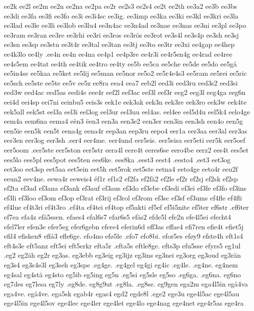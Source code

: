 ee2k
ee2l
ee2m
ee2n
ee2na
ee2pa
ee2r
ee2s3
ee2s4
ee2t
ee2th
ee3a2
ee3b
ee3bs
ee3di
ee3fa
ee3fi
ee3fo
ee3i
ee3i4sc
ee3ig.
ee3imp
ee3ka
ee3ki
ee3kl
ee3kri
ee3la
ee3lad
ee3le
ee3li
ee3lob
ee3lu4
ee3n4ac
ee3n4ad
ee3nae
ee3nas
ee3ni
ee3pl
ee3po
ee3ram
ee3ran
ee3re
ee3rhi
ee3ri
ee3ros
ee3rös
ee3rot
ee3s4l
ee3s4p
ee3sh
ee3sj
ee3sn
ee3sp
ee3stu
ee3t4r
ee3tal
ee3tan
ee3tj
ee3to
ee3tr
ee3xi
ee4gap
ee4hep
ee4k3lo
ee4ly
.ee4n
ee4n
ee4na
ee4p1
ee4p3re
ee4r3i
ee4r5en4g
ee4rad
ee4ree
ee4s5em
ee4tat
ee4th
ee4tik
ee4tro
ee4ty
ee5b
ee5ca
ee5che
ee5de
ee5do
ee5gå
ee5in4se
ee5kaa
ee5ket
ee5lij
ee5man
ee5nor
ee5o2
ee5r4e4s3
ee5ram
ee5rei
ee5ric
ee5sch
ee5ste
ee5te
ee5v
ee5z
ee8ra
eea4
eea7
eeb2l
eed3i
eed3ru
eed3s2
eed3si
eed3w
eed4ac
eed5as
eedi4e
eee4r
eef2l
eef3ac
eef3l
eef3r
eeg2
eeg3l
eeg4ga
eeg6n
eei4d
eei4sp
eei7ni
eeinbu5
eeis3s
eek1e
eek3ak
eek3n
eek3re
eek3ro
eek3w
eek4te
eek5all
eek5st
eel3a
eel3i
eel3og
eel3ur
eel3uu
eel4as.
eel4ee
eel5d4u
eel5k4
eelo4ge
eem4a
eem6na
eema4
eën3
ëen3
een3a
een3e2
een3er
een3in
een3sh
een4o
een5g
een5ie
een5k
een5t
eena4g
eena4r
eep3an
eep3ru
eepo4
eer1a
eer3aa
eer3al
eer3as
eer3en
eer3og
eer3sh
.eer4
eer4me.
eer4und
eer5eis.
eer5eisa
eer5eti
eer5k
eer5oef
eer5oom
.eer5ste
eer5ston
eer5str
eera4l
eere4t
eeres6se
eero4be
eerz2
ees4t
ees5et
ees5lo
ees5pl
ees5pot
ees5ten
ees6ke.
ees8ka
.eest3
eest4
.eesto4
.eet3
eet3og
eet3oo
eet3sp
eet5aa
eet5ein
eet5h
eet5rok
eet5ste
eetna4
eeto4ge
eeto4r
eeu2f
eeun2
eev4ne.
eewa4r
eeweis4
éf1r
ef1s2
ef2fa
ef2fä2
ef2le
ef2r
ef2sj
ef2sk
ef2sp
ef2ta
ef3ad
ef3ana
ef3ank
ef3auf
ef3aus
ef3do
ef3ebe
ef3edi
ef3ei
ef3fe
ef3fo
ef3ins
ef3li
ef3loo
ef3om
ef3op
ef3rat
ef3rij
ef3rol
ef3rom
ef3sc
ef3sf
ef3ums
ef4fle
ef4fli
ef4lue
ef4t3ri
ef4t3ro
.ef4ta
ef4tei
ef4top
ef5akti
ef5ef
ef5i5nite
ef5ter
ef6str
.ef6ter
ef7ea
efa4z
efä5ssen.
efaes4
efal6s7
efar6s5
efäs2
efde5l
efe2n
efe4l5ei
efecht4
efel7ler
efen3e
efer5eg
efer6gebn
efere4
eferin6d
eff3as
effae4
efi7ren
efie4t
efiet5j
efil4
efisken8
eflå3
efle6ge.
efo4no
efø5le
.efo7
efo8bi.
efor5es
eføy9
efste4h
eft1s4
eft4s3e
eft5anz
eft5ei
eft5erkr
efta5r
.efta5s
eftle8ge.
efts3p
efu5sse
efyrs5
eg1ul
.eg2
eg2äh
eg2r
eg3as.
eg3ebb
eg3eig
eg3ijz
eg3ins
eg3nei
eg3org
eg3oud
eg3rän
eg3s4
eg3s4e3l
eg3seh
eg3spe
.eg4ge.
.eg4gel
eg4gi
eg4ic
.eg4le.
.eg4ne.
eg4nem
eg4sal
eg4stä
eg4sto
eg5ib
eg5ing
eg5n
.eg5si
eg5sle
eg5so
.eg6ga.
.eg6na.
eg6no
eg7des
eg7lesa
eg7ly
.eg8de.
eg8g9ut
.eg8la.
.eg8se.
eg9gen
ega2m
ega4l5in
egå4va
ega4ve.
egå4ve.
ega5sk
egab4r
egas4
egd2
egde8l
.ege2
ege3u
ege4l5ac
ege4l5au
ege4l5in
ege4l5ov
ege4lec
ege4ler
ege4let
ege4lo
ege4nag
ege4net
ege4r5as
ege4ra
